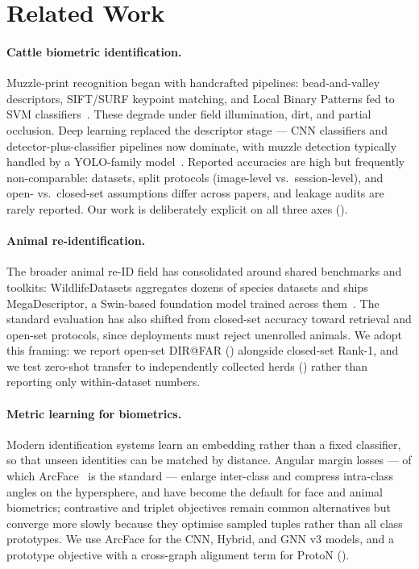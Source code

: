 \documentclass[11pt]{article}
\begin{document}
\section{Related Work}

\paragraph{Cattle biometric identification.} Muzzle-print recognition began with handcrafted
pipelines: bead-and-valley descriptors, SIFT/SURF keypoint matching, and Local Binary Patterns
fed to SVM classifiers~\cite{kumar,bello}. These degrade under field illumination, dirt, and
partial occlusion. Deep learning replaced the descriptor stage --- CNN classifiers and
detector-plus-classifier pipelines now dominate, with muzzle detection typically handled by a
YOLO-family model~\cite{bello,yolo}. Reported accuracies are high but frequently
non-comparable: datasets, split protocols (image-level vs.\ session-level), and open- vs.\
closed-set assumptions differ across papers, and leakage audits are rarely reported. Our work
is deliberately explicit on all three axes (\Cref{sec:data}).

\paragraph{Animal re-identification.} The broader animal re-ID field has consolidated around
shared benchmarks and toolkits: WildlifeDatasets aggregates dozens of species datasets and
ships MegaDescriptor, a Swin-based foundation model trained across them~\cite{megadesc}. The
standard evaluation has also shifted from closed-set accuracy toward retrieval and open-set
protocols, since deployments must reject unenrolled animals. We adopt this framing: we report
open-set DIR@FAR (\Cref{sec:openset}) alongside closed-set Rank-1, and we test zero-shot
transfer to independently collected herds (\Cref{sec:cross}) rather than reporting only
within-dataset numbers.

\paragraph{Metric learning for biometrics.} Modern identification systems learn an embedding
rather than a fixed classifier, so that unseen identities can be matched by distance. Angular
margin losses --- of which ArcFace~\cite{arcface} is the standard --- enlarge inter-class and
compress intra-class angles on the hypersphere, and have become the default for face and
animal biometrics; contrastive and triplet objectives remain common alternatives but converge
more slowly because they optimise sampled tuples rather than all class prototypes. We use
ArcFace for the CNN, Hybrid, and GNN v3 models, and a prototype objective with a cross-graph
alignment term for ProtoN (\Cref{tab:trainsetup}).
\end{document}
